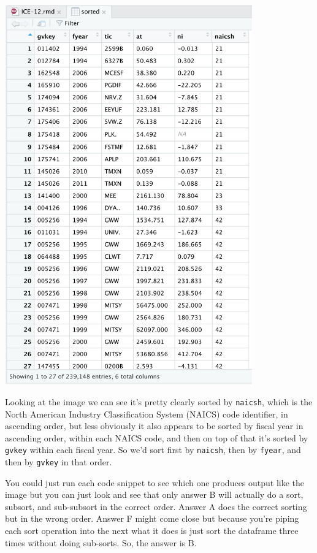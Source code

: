 \documentclass[11pt]{article}
\begin{document}
\begin{center}
\includegraphics[width=0.8\textwidth]{./q5.png}
\end{center}


Looking at the image we can see it's pretty clearly sorted by \texttt{naicsh}, which is the North American Industry Classification System (NAICS) code identifier, in ascending order, but less obviously it also appears to be sorted by fiscal year in ascending order, within each NAICS code, and then on top of that it's sorted by \texttt{gvkey} within each fiscal year.  So we'd sort first by \texttt{naicsh}, then by \texttt{fyear}, and then by \texttt{gvkey} in that order.

You could just run each code snippet to see which one produces output like the image but you can just look and see that only answer B will actually do a sort, subsort, and sub-subsort in the correct order.  Answer A does the correct sorting but in the wrong order.  Answer F might come close but because you're piping each sort operation into the next what it does is just sort the dataframe three times without doing sub-sorts.   So, the answer is B.
\end{document}

